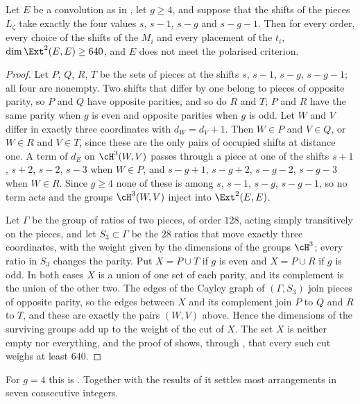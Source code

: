 \begin{proposition}\label{prop:efourpairsg}
Let $E$ be a convolution as in \cite[Lemma~18.36]{BMB26}, let $g\ge4$, and suppose that the shifts of the pieces $L_{\zeta}$ take exactly the four values $s$, $s-1$, $s-g$ and $s-g-1$. Then for every order, every choice of the shifts of the $M_{i}$ and every placement of the $t_{i}$, $\dim\Ext^{2}(E,E)\ge640$, and $E$ does not meet the polarised criterion.
\end{proposition}

\begin{proof}
Let $P$, $Q$, $R$, $T$ be the sets of pieces at the shifts $s$, $s-1$, $s-g$, $s-g-1$; all four are nonempty. Two shifts that differ by one belong to pieces of opposite parity, so $P$ and $Q$ have opposite parities, and so do $R$ and $T$; $P$ and $R$ have the same parity when $g$ is even and opposite parities when $g$ is odd. Let $W$ and $V$ differ in exactly three coordinates with $d_{W}=d_{V}+1$. Then $W\in P$ and $V\in Q$, or $W\in R$ and $V\in T$, since these are the only pairs of occupied shifts at distance one. A term of $d_{E}$ on $\cH^{3}(W,V)$ passes through a piece at one of the shifts $s+1$, $s+2$, $s-2$, $s-3$ when $W\in P$, and $s-g+1$, $s-g+2$, $s-g-2$, $s-g-3$ when $W\in R$. Since $g\ge4$ none of these is among $s$, $s-1$, $s-g$, $s-g-1$, so no term acts and the groups $\cH^{3}(W,V)$ inject into $\Ext^{2}(E,E)$.

Let $\Gamma$ be the group of ratios of two pieces, of order $128$, acting simply transitively on the pieces, and let $S_{3}\subset\Gamma$ be the $28$ ratios that move exactly three coordinates, with the weight given by the dimensions of the groups $\cH^{3}$; every ratio in $S_{3}$ changes the parity. Put $X=P\cup T$ if $g$ is even and $X=P\cup R$ if $g$ is odd. In both cases $X$ is a union of one set of each parity, and its complement is the union of the other two. The edges of the Cayley graph of $(\Gamma,S_{3})$ join pieces of opposite parity, so the edges between $X$ and its complement join $P$ to $Q$ and $R$ to $T$, and these are exactly the pairs $(W,V)$ above. Hence the dimensions of the surviving groups add up to the weight of the cut of $X$. The set $X$ is neither empty nor everything, and the proof of \cite[Prop.~18.47]{BMB26} shows, through \cite[Lemma~18.40]{BMB26}, that every such cut weighs at least $640$.
\end{proof}

For $g=4$ this is \cite[Prop.~18.47]{BMB26}. Together with the results of \cite[\S18]{BMB26} it settles most arrangements in seven consecutive integers.

